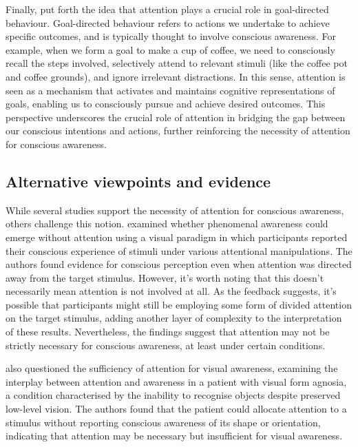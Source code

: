 \documentclass[10pt]{article}
\begin{document}
\begin{sloppypar}
  Finally, \cite{dijksterhuis_goals_2010} put forth the idea that attention plays a crucial role in goal-directed behaviour. Goal-directed behaviour refers to actions we undertake to achieve specific outcomes, and is typically thought to involve conscious awareness. For example, when we form a goal to make a cup of coffee, we need to consciously recall the steps involved, selectively attend to relevant stimuli (like the coffee pot and coffee grounds), and ignore irrelevant distractions. In this sense, attention is seen as a mechanism that activates and maintains cognitive representations of goals, enabling us to consciously pursue and achieve desired outcomes. This perspective underscores the crucial role of attention in bridging the gap between our conscious intentions and actions, further reinforcing the necessity of attention for conscious awareness.


  \subsection{Alternative viewpoints and evidence}
  \label{sec:alternative}

  While several studies support the necessity of attention for conscious awareness, others challenge this notion. \cite{aru_phenomenal_2013} examined whether phenomenal awareness could emerge without attention using a visual paradigm in which participants reported their conscious experience of stimuli under various attentional manipulations. The authors found evidence for conscious perception even when attention was directed away from the target stimulus. However, it's worth noting that this doesn't necessarily mean attention is not involved at all. As the feedback suggests, it's possible that participants might still be employing some form of divided attention on the target stimulus, adding another layer of complexity to the interpretation of these results. Nevertheless, the findings suggest that attention may not be strictly necessary for conscious awareness, at least under certain conditions.

  \cite{kentridge_attended_2008} also questioned the sufficiency of attention for visual awareness, examining the interplay between attention and awareness in a patient with visual form agnosia, a condition characterised by the inability to recognise objects despite preserved low-level vision. The authors found that the patient could allocate attention to a stimulus without reporting conscious awareness of its shape or orientation, indicating that attention may be necessary but insufficient for visual awareness.


\end{sloppypar}
\end{document}
